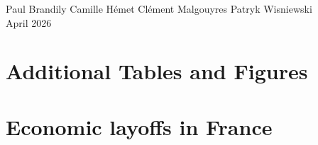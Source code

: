 \documentclass[12pt,french,american,a4paper]{article}
\begin{document}

\newpage
\appendix

\setcounter{page}{1}

\setcounter{table}{0}
\renewcommand{\thetable}{A\arabic{table}}

\setcounter{figure}{0}
\renewcommand{\thefigure}{A\arabic{figure}}

\begin{center}
	\bigskip
	
	
	
	{\large
	Paul Brandily \qquad Camille Hémet \qquad Clément Malgouyres \qquad Patryk Wisniewski }\bigskip\\
	{\large April 2026}

\end{center}

\startcontents[sections]



\clearpage
\section{Additional Tables and Figures}



\clearpage
\section{Economic layoffs in France}

\end{document}
